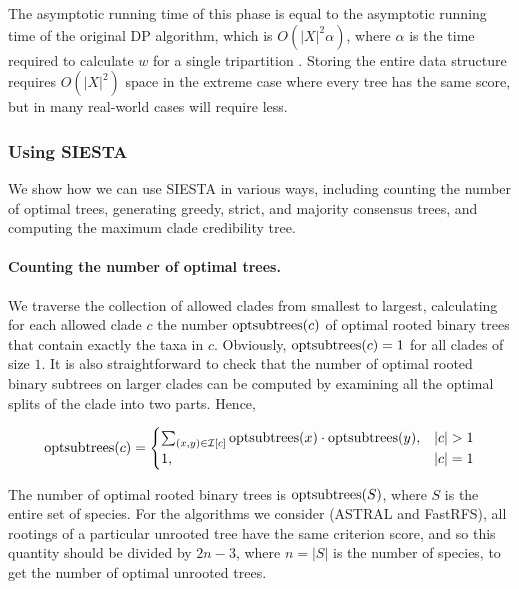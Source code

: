 The asymptotic running time of this phase is equal to the asymptotic running time of the original DP algorithm, which  is $O(|X|^2 \alpha)$, where $\alpha$ is the time required to calculate $w$ for a single tripartition \cite{mirarab2014astral}.
Storing the entire data structure requires $O(|X|^2)$ space in the extreme case where every tree has the same score, but in many real-world cases will require less.

  \setcounter{secnumdepth}{3}

\subsubsection{Using SIESTA}
We show how we can use SIESTA in various ways, including counting the number of optimal trees, generating greedy, strict, and majority consensus trees, and computing the maximum clade credibility tree.

\paragraph{Counting the number of optimal trees. }
 
We traverse the collection of allowed clades from smallest to largest, calculating for each allowed clade $c$ the number  $\mathop{\rm optsubtrees}(c)$ of optimal rooted binary trees that contain exactly the taxa in $c$. Obviously, $\mathop{\rm optsubtrees}(c)=1$ for all clades of size $1$.
It is also straightforward to check that the number of optimal rooted binary subtrees on larger clades can be computed by examining all the optimal splits of the clade into two parts. Hence, 

\begin{equation}
\mathop{\rm optsubtrees}(c) = 
\begin{cases}
\sum_{(x, y) \in \mathcal{I}[c]}  \mathop{\rm optsubtrees}(x) \cdot \mathop{\rm optsubtrees}(y),  & |c|>1 
\\
 1, & |c|=1
\end{cases}
\end{equation}

The number of optimal rooted binary trees is $\mathop{\rm optsubtrees}(S)$, where $S$ is the entire set of species.
For the algorithms we consider (ASTRAL and FastRFS), all rootings of a particular unrooted tree have the same criterion score, and so this  quantity should be divided by $2n - 3$, where $n=|S|$ is the number of species, to get the number of optimal unrooted trees.

